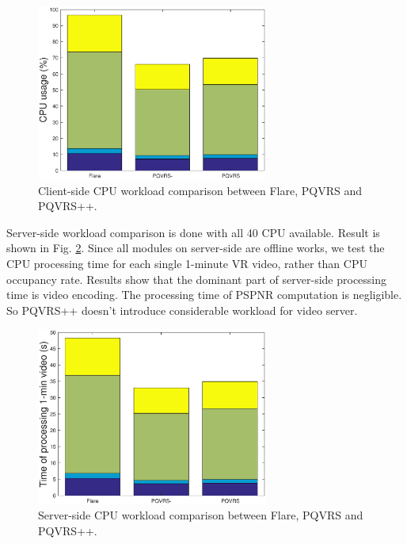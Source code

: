     \begin{figure}
  \centering
  \includegraphics[width=3in]{images/CPUworkload.eps}
  \caption{Client-side CPU workload comparison between Flare, PQVRS and PQVRS++.}
  \label{CPUclient}
  \end{figure}
  
Server-side workload comparison is done with all 40 CPU available. Result is shown in Fig. \ref{CPUserver}. Since all modules on server-side are offline works, we test the CPU processing time for each single 1-minute VR video, rather than CPU occupancy rate. Results show that the dominant part of server-side processing time is video encoding. The processing time of PSPNR computation is negligible. So PQVRS++ doesn't introduce considerable workload for video server.

    \begin{figure}
  \centering
  \includegraphics[width=3in]{images/Processtime.eps}
  \caption{Server-side CPU workload comparison between Flare, PQVRS and PQVRS++.}
  \label{CPUserver}
  \end{figure}